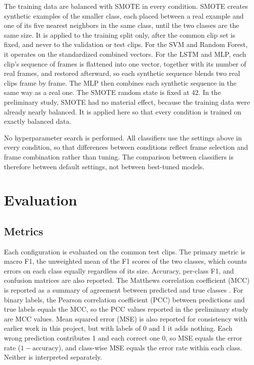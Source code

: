 The training data are balanced with SMOTE \cite{chawla2002} in every condition. SMOTE creates synthetic examples of the smaller class, each placed between a real example and one of its five nearest neighbors in the same class, until the two classes are the same size. It is applied to the training split only, after the common clip set is fixed, and never to the validation or test clips. For the SVM and Random Forest, it operates on the standardized combined vectors. For the LSTM and MLP, each clip's sequence of frames is flattened into one vector, together with its number of real frames, and restored afterward, so each synthetic sequence blends two real clips frame by frame. The MLP then combines each synthetic sequence in the same way as a real one. The SMOTE random state is fixed at 42. In the preliminary study, SMOTE had no material effect, because the training data were already nearly balanced. It is applied here so that every condition is trained on exactly balanced data.

No hyperparameter search is performed. All classifiers use the settings above in every condition, so that differences between conditions reflect frame selection and frame combination rather than tuning. The comparison between classifiers is therefore between default settings, not between best-tuned models.



\section{Evaluation}
\label{sec:evaluation}

\subsection{Metrics}
\label{sec:metrics}

Each configuration is evaluated on the common test clips. The primary metric is macro F1, the unweighted mean of the F1 scores of the two classes, which counts errors on each class equally regardless of its size. Accuracy, per-class F1, and confusion matrices are also reported. The Matthews correlation coefficient (MCC) is reported as a summary of agreement between predicted and true classes \cite{chicco2020}. For binary labels, the Pearson correlation coefficient (PCC) between predictions and true labels equals the MCC, so the PCC values reported in the preliminary study are MCC values. Mean squared error (MSE) is also reported for consistency with earlier work in this project, but with labels of 0 and 1 it adds nothing. Each wrong prediction contributes 1 and each correct one 0, so MSE equals the error rate ($1 - \text{accuracy}$), and class-wise MSE equals the error rate within each class. Neither is interpreted separately.

